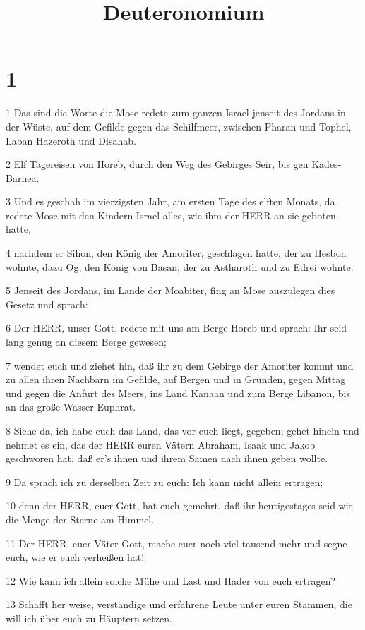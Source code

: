 

\title{Deuteronomium}


\chapter{1}

\par 1 Das sind die Worte die Mose redete zum ganzen Israel jenseit des Jordans in der Wüste, auf dem Gefilde gegen das Schilfmeer, zwischen Pharan und Tophel, Laban Hazeroth und Disahab.
\par 2 Elf Tagereisen von Horeb, durch den Weg des Gebirges Seir, bis gen Kades-Barnea.
\par 3 Und es geschah im vierzigsten Jahr, am ersten Tage des elften Monats, da redete Mose mit den Kindern Israel alles, wie ihm der HERR an sie geboten hatte,
\par 4 nachdem er Sihon, den König der Amoriter, geschlagen hatte, der zu Hesbon wohnte, dazu Og, den König von Basan, der zu Astharoth und zu Edrei wohnte.
\par 5 Jenseit des Jordans, im Lande der Moabiter, fing an Mose auszulegen dies Gesetz und sprach:
\par 6 Der HERR, unser Gott, redete mit uns am Berge Horeb und sprach: Ihr seid lang genug an diesem Berge gewesen;
\par 7 wendet euch und ziehet hin, daß ihr zu dem Gebirge der Amoriter kommt und zu allen ihren Nachbarn im Gefilde, auf Bergen und in Gründen, gegen Mittag und gegen die Anfurt des Meers, ins Land Kanaan und zum Berge Libanon, bis an das große Wasser Euphrat.
\par 8 Siehe da, ich habe euch das Land, das vor euch liegt, gegeben; gehet hinein und nehmet es ein, das der HERR euren Vätern Abraham, Isaak und Jakob geschworen hat, daß er's ihnen und ihrem Samen nach ihnen geben wollte.
\par 9 Da sprach ich zu derselben Zeit zu euch: Ich kann nicht allein ertragen;
\par 10 denn der HERR, euer Gott, hat euch gemehrt, daß ihr heutigestages seid wie die Menge der Sterne am Himmel.
\par 11 Der HERR, euer Väter Gott, mache euer noch viel tausend mehr und segne euch, wie er euch verheißen hat!
\par 12 Wie kann ich allein solche Mühe und Last und Hader von euch ertragen?
\par 13 Schafft her weise, verständige und erfahrene Leute unter euren Stämmen, die will ich über euch zu Häuptern setzen.

